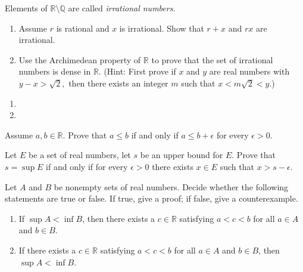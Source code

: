 \documentclass[12pt,letterpaper,boxed]{hmcpset}
\begin{document}
\begin{solution}
\end{solution}

\begin{problem}[Exercise 4.6.]
Elements of $\mathbb{R}\setminus\mathbb{Q}$ are called \textit{irrational numbers}.
\begin{enumerate}
	\itemsep0em
	\item Assume $r$ is rational and $x$ is irrational. Show that $r + x$ and $rx$ are irrational.
	\item Use the Archimedean property of $\mathbb{R}$ to prove that the set of irrational numbers is dense in $\mathbb{R}.$ (Hint: First prove if $x$ and $y$ are real numbers with $y - x > \sqrt{2},$ then there exists an integer $m$ such that $x < m\sqrt{2} < y$.)
\end{enumerate}
\end{problem}

\begin{solution}
\begin{enumerate}
	\itemsep0em
	\item 
	\item 
\end{enumerate}
\end{solution}

\begin{problem}[Exercise 4.8.]
Assume $a, b \in \mathbb{R}.$ Prove that $a \leq b$ if and only if $a \leq b + \epsilon$ for every $\epsilon > 0.$
\end{problem}

\begin{solution}
\end{solution}

\begin{problem}[Exercise 4.9.]
Let $E$ be a set of real numbers, let $s$ be an upper bound for $E$. Prove that $s = \sup E$ if and only if for every $\epsilon > 0$ there exists $x \in E$ such that $x > s - \epsilon.$
\end{problem}

\begin{solution}
\end{solution}

\begin{problem}[Exercise 4.10.]
Let $A$ and $B$ be nonempty sets of real numbers. Decide whether the following statements are true or false. If true, give a proof; if false, give a counterexample.
\begin{enumerate}
	\itemsep0em
	\item If $\sup A < \inf B$, then there exists a $c \in \mathbb{R}$ satisfying $a < c < b$ for all $a \in A$ and $b \in B$.
	\item If there exists a $c\in \mathbb{R}$ satisfying $a < c < b$ for all $a \in A$ and $b \in B$, then $\sup A < \inf B$.
\end{enumerate}
\end{problem}

\begin{solution}
\end{solution}
\end{document}
